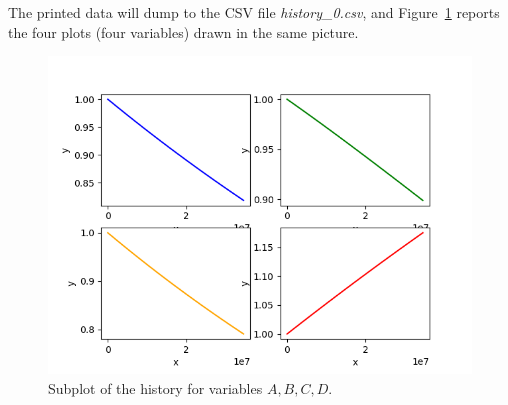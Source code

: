 The printed data will dump to the CSV file \textit{history\_0.csv}, and Figure~\ref{fig:historySubPlotLine} reports the four plots (four variables) drawn in the same picture.

\begin{figure}[h!]
  \centering
  \includegraphics[scale=0.7]{../../tests/framework/user_guide/ravenTutorial/gold/subPlot/1-historyPlot_line-line-line-line.png}
  \caption{Subplot of the history for variables $A,B,C,D$.}
  \label{fig:historySubPlotLine}
\end{figure}
